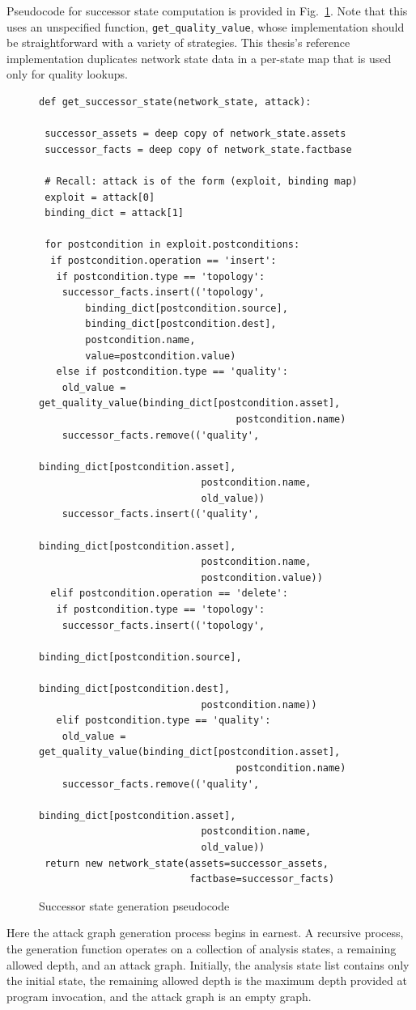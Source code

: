 Pseudocode for successor state computation is provided in 
Fig.~\ref{fig:get_succstate_pc}. Note that this uses an unspecified function,
\texttt{get\_quality\_value}, whose implementation should be straightforward
with a variety of strategies. This thesis's reference implementation duplicates
network state data in a per-state map that is used only for quality lookups.
\begin{figure}
\begin{lstlisting}
def get_successor_state(network_state, attack):

 successor_assets = deep copy of network_state.assets
 successor_facts = deep copy of network_state.factbase
 
 # Recall: attack is of the form (exploit, binding map)
 exploit = attack[0]
 binding_dict = attack[1]
 
 for postcondition in exploit.postconditions:
  if postcondition.operation == 'insert':
   if postcondition.type == 'topology':
    successor_facts.insert(('topology',
        binding_dict[postcondition.source],
        binding_dict[postcondition.dest],
        postcondition.name,
        value=postcondition.value)
   else if postcondition.type == 'quality':
    old_value = get_quality_value(binding_dict[postcondition.asset], 
                                  postcondition.name)
    successor_facts.remove(('quality',
                            binding_dict[postcondition.asset],
                            postcondition.name,
                            old_value))
    successor_facts.insert(('quality',
                            binding_dict[postcondition.asset],
                            postcondition.name,
                            postcondition.value))
  elif postcondition.operation == 'delete':
   if postcondition.type == 'topology':
    successor_facts.insert(('topology',
                            binding_dict[postcondition.source],
                            binding_dict[postcondition.dest],
                            postcondition.name))
   elif postcondition.type == 'quality':
    old_value = get_quality_value(binding_dict[postcondition.asset], 
                                  postcondition.name)
    successor_facts.remove(('quality',
                            binding_dict[postcondition.asset],
                            postcondition.name,
                            old_value))
 return new network_state(assets=successor_assets,
                          factbase=successor_facts)
\end{lstlisting}
\caption{Successor state generation pseudocode}
\label{fig:get_succstate_pc}
\end{figure}
Here the attack graph generation process begins in earnest. A recursive process,
the generation function operates on a collection of analysis states, a remaining
allowed depth, and an attack graph. Initially, the analysis state
list contains only the initial state, the remaining allowed depth is the maximum
depth provided at program invocation, and the attack graph is an empty graph.

